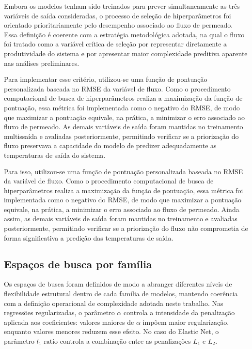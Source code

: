 Embora os modelos tenham sido treinados para prever simultaneamente as três variáveis de saída consideradas, o processo de seleção de hiperparâmetros foi orientado prioritariamente pelo desempenho associado ao fluxo de permeado. Essa definição é coerente com a estratégia metodológica adotada, na qual o fluxo foi tratado como a variável crítica de seleção por representar diretamente a produtividade do sistema e por apresentar maior complexidade preditiva aparente nas análises preliminares.

Para implementar esse critério, utilizou-se uma função de pontuação personalizada baseada no RMSE da variável de fluxo. Como o procedimento computacional de busca de hiperparâmetros realiza a maximização da função de pontuação, essa métrica foi implementada como o negativo do RMSE, de modo que maximizar a pontuação equivale, na prática, a minimizar o erro associado ao fluxo de permeado. As demais variáveis de saída foram mantidas no treinamento multissaída e avaliadas posteriormente, permitindo verificar se a priorização do fluxo preservava a capacidade do modelo de predizer adequadamente as temperaturas de saída do sistema.

Para isso, utilizou-se uma função de pontuação personalizada baseada no RMSE da variável de fluxo. Como o procedimento computacional de busca de hiperparâmetros realiza a maximização da função de pontuação, essa métrica foi implementada como o negativo do RMSE, de modo que maximizar a pontuação equivale, na prática, a minimizar o erro associado ao fluxo de permeado. Ainda assim, as demais variáveis de saída foram mantidas no treinamento e avaliadas posteriormente, permitindo verificar se a priorização do fluxo não comprometia de forma significativa a predição das temperaturas de saída.


\subsection{Espaços de busca por família}
\label{subsec:espacos_busca}

Os espaços de busca foram definidos de modo a abranger diferentes níveis de flexibilidade estrutural dentro de cada família de modelos, mantendo coerência com a definição operacional de complexidade adotada neste trabalho. Nas regressões regularizadas, o parâmetro \(\alpha\) controla a intensidade da penalização aplicada aos coeficientes: valores maiores de \(\alpha\) impõem maior regularização, enquanto valores menores reduzem esse efeito. No caso do Elastic Net, o parâmetro \(l_1\text{-ratio}\) controla a combinação entre as penalizações \(L_1\) e \(L_2\).

